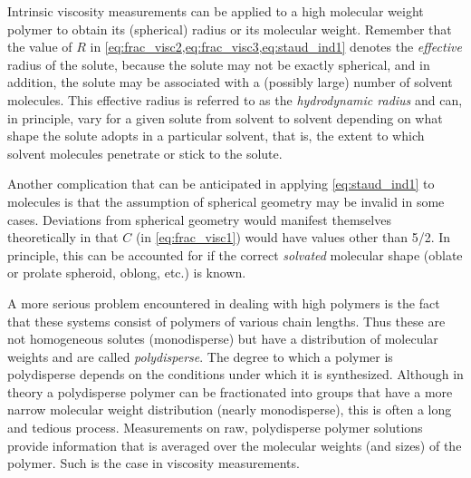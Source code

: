 Intrinsic viscosity measurements can be applied to a high molecular weight polymer to obtain its (spherical) radius or its molecular weight. 
Remember that the value of \( R \) in \cref{eq:frac_visc2,eq:frac_visc3,eq:staud_ind1} denotes the \emph{effective} radius of the solute, because the solute may not be exactly spherical, and in addition, the solute may be associated with a (possibly large) number of solvent molecules. 
This effective radius is referred to as the \emph{hydrodynamic radius} and can, in principle, vary for a given solute from solvent to solvent depending on what shape the solute adopts in a particular solvent, that is, the extent to which solvent molecules penetrate or stick to the solute.

Another complication that can be anticipated in applying \cref{eq:staud_ind1} to molecules is that the assumption of spherical geometry may be invalid in some cases. 
Deviations from spherical geometry would manifest themselves theoretically in that \( C \) (in \cref{eq:frac_visc1}) would have values other than \num[parse-numbers=false]{5/2}. 
In principle, this can be accounted for if the correct \emph{solvated} molecular shape (oblate or prolate spheroid, oblong, etc.) is known.

A more serious problem encountered in dealing with high polymers is the fact that these systems consist of polymers of various chain lengths. 
Thus these are not homogeneous solutes (monodisperse) but have a distribution of molecular weights and are called \emph{polydisperse}. 
The degree to which a polymer is polydisperse depends on the conditions under which it is synthesized. 
Although in theory a polydisperse polymer can be fractionated into groups that have a more narrow molecular weight distribution (nearly monodisperse), this is often a long and tedious process. 
Measurements on raw, polydisperse polymer solutions provide information that is averaged over the molecular weights (and sizes) of the polymer. 
Such is the case in viscosity measurements.


